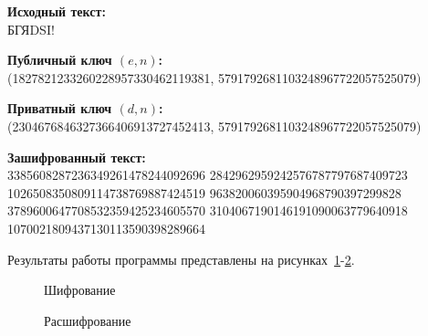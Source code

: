 \textbf{Исходный текст:} \\
    БГЯDSI!

\textbf{Публичный ключ $(e, n)$:} \\
    (1827821233260228957330462119381, 5791792681103248967722057525079)

\textbf{Приватный ключ $(d, n)$:} \\
    (2304676846327366406913727452413, 5791792681103248967722057525079)

\textbf{Зашифрованный текст:} \\
    3385608287236349261478244092696 2842962959242576787797687409723
    1026508350809114738769887424519 963820060395904968790397299828
    3789600647708532359425234605570 3104067190146191090063779640918
    1070021809437130113590398289664

Результаты работы программы представлены на рисунках~\ref{ris:encode-test-5}-\ref{ris:decode-test-5}.

\vspace{\baselineskip}
\begin{figure}[H]
    \caption{Шифрование}
\label{ris:encode-test-5}
\end{figure}

\vspace{\baselineskip}
\begin{figure}[H]
    \caption{Расшифрование}
\label{ris:decode-test-5}
\end{figure}
